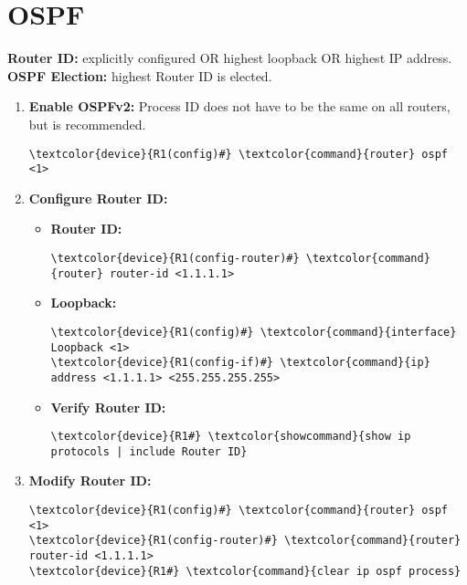 \documentclass[10pt, a4paper, onecolumn, oneside, titlepage, openany]{book}
\begin{document}
\section{OSPF}
\textbf{Router ID:} explicitly configured OR highest loopback OR highest IP address.
\textbf{OSPF Election:} highest Router ID is elected.
\begin{enumerate}
    \item \textbf{Enable OSPFv2:}
\newline Process ID does not have to be the same on all routers, but is recommended.
\begin{Verbatim}[commandchars=\\\{\}]
\textcolor{device}{R1(config)#} \textcolor{command}{router} ospf <1>
\end{Verbatim}
    \item \textbf{Configure Router ID:}
    \begin{itemize}
        \item \textbf{Router ID:}
\begin{Verbatim}[commandchars=\\\{\}]
\textcolor{device}{R1(config-router)#} \textcolor{command}{router} router-id <1.1.1.1>
\end{Verbatim}
    \item \textbf{Loopback:}
\begin{Verbatim}[commandchars=\\\{\}]
\textcolor{device}{R1(config)#} \textcolor{command}{interface} Loopback <1>
\textcolor{device}{R1(config-if)#} \textcolor{command}{ip} address <1.1.1.1> <255.255.255.255>
\end{Verbatim}
    \item \textbf{Verify Router ID:}
\begin{Verbatim}[commandchars=\\\{\}]
\textcolor{device}{R1#} \textcolor{showcommand}{show ip protocols | include Router ID}
\end{Verbatim}
    \end{itemize}
    \item \textbf{Modify Router ID:}
\begin{Verbatim}[commandchars=\\\{\}]
\textcolor{device}{R1(config)#} \textcolor{command}{router} ospf <1>
\textcolor{device}{R1(config-router)#} \textcolor{command}{router} router-id <1.1.1.1>
\textcolor{device}{R1#} \textcolor{command}{clear ip ospf process}
\end{Verbatim}
\end{enumerate}
\end{document}
